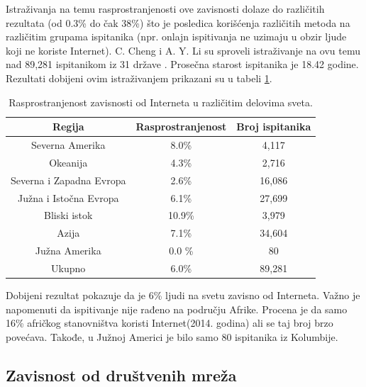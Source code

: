 \documentclass[a4paper]{article}
\begin{document}
Istraživanja na temu rasprostranjenosti ove zavisnosti dolaze do različitih rezultata (od 0.3\% do čak 38\%) što je posledica korišćenja različitih metoda na različitim grupama ispitanika (npr. onlajn ispitivanja ne uzimaju u obzir ljude koji ne koriste Internet).
C. Cheng i A. Y. Li su sproveli istraživanje na ovu temu nad 89,281 ispitanikom iz 31 države \cite{prevalence}.
Prosečna starost ispitanika je 18.42 godine.
Rezultati dobijeni ovim istraživanjem prikazani su u tabeli \ref{tab:tabela1}.

\begin{table}[h!]
\begin{center}
\caption{Rasprostranjenost zavisnosti od Interneta u različitim delovima sveta.}

\begin{tabular}{|c|c|c|} \hline
Regija& Rasprostranjenost& Broj ispitanika\\ \hline
Severna Amerika &8.0\% &4,117\\ \hline
Okeanija &4.3\% &2,716\\ \hline
Severna i Zapadna Evropa &2.6\% &16,086\\ \hline
Južna i Istočna Evropa &6.1\% &27,699\\ \hline
Bliski istok &10.9\% & 3,979\\ \hline
Azija &7.1\% &34,604\\ \hline
Južna Amerika & 0.0 \% & 80\\ \hline
Ukupno &6.0\% &89,281\\ \hline 
\end{tabular}
\label{tab:tabela1}
\end{center}
\end{table}

Dobijeni rezultat pokazuje da je 6\% ljudi na svetu zavisno od Interneta. Važno je napomenuti da ispitivanje nije rađeno na području Afrike. Procena je da samo 16\% afričkog stanovništva koristi Internet(2014. godina) ali se taj broj brzo povećava. Takođe, u Južnoj Americi je bilo samo 80 ispitanika iz Kolumbije.

\subsection{Zavisnost od društvenih mreža}
\label{subsec:podnaslovIP5}
\end{document}
